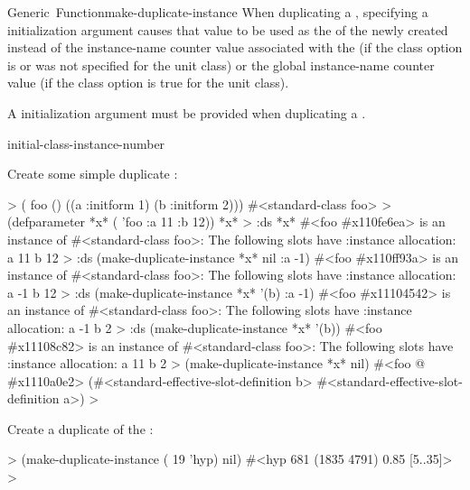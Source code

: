 \documentclass[10pt,twoside,english,pdftex]{article}
\begin{document}
\begin{functiondoc}{Generic~Function}{make-duplicate-instance}{%
    }
When duplicating a , specifying a
 initialization argument causes that value to be
used as the  of the newly created 
instead of the instance-name counter value associated with the
 (if the 
class option is \nil{} or was not specified for the unit class) or the global
instance-name counter value (if the
 class option is true for the
unit class).

A  initialization argument must be provided when
duplicating a .

\begin{alsos}{initial-class-instance-number}
\end{alsos}

\fnexamples
Create some simple duplicate :
%
%
%
%
\W\supp
\begin{example}
  > ( foo () 
       ((a :initform 1)
        (b :initform 2)))
  #<standard-class foo>
  > (defparameter *x* ( 'foo :a 11 :b 12))
  *x*
  > :ds *x*
  #<foo #x110fe6ea> is an instance of #<standard-class foo>:
   The following slots have :instance allocation:
    a   11
    b   12
  > :ds (make-duplicate-instance *x* nil :a -1)
  #<foo #x110ff93a> is an instance of #<standard-class foo>:
   The following slots have :instance allocation:
    a   -1
    b   12\goodpagebreak
  > :ds (make-duplicate-instance *x* '(b) :a -1)
  #<foo #x11104542> is an instance of #<standard-class foo>:
   The following slots have :instance allocation:
    a   -1
    b   2
  > :ds (make-duplicate-instance *x* '(b))
  #<foo #x11108c82> is an instance of #<standard-class foo>:
   The following slots have :instance allocation:
    a   11
    b   2
  > (make-duplicate-instance *x* nil)
  #<foo @ #x1110a0e2>
  (#<standard-effective-slot-definition b>
   #<standard-effective-slot-definition a>)
  >
\end{example}

% 
Create a duplicate of the   :
%
\W\supp
\begin{example}
  > (make-duplicate-instance ( 19 'hyp) nil)
  #<hyp 681 (1835 4791) 0.85 [5..35]>
  >
\end{example}

\end{functiondoc}
\end{document}
